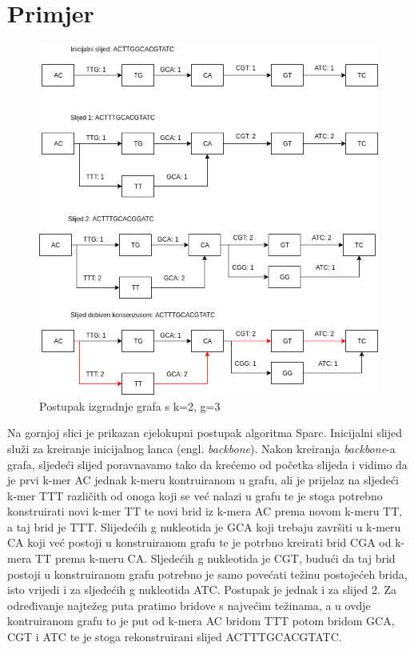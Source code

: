 \documentclass[times, utf8, seminar, numeric]{fer}
\begin{document}
\section{Primjer}
\begin{figure}[htb]
	\centering
	\includegraphics[scale=0.6]{images/backbone.png}
	\caption{Postupak izgradnje grafa s k=2, g=3}
	\label{example}
\end{figure}

Na gornjoj slici je prikazan cjelokupni postupak algoritma Sparc. Inicijalni slijed služi za kreiranje inicijalnog lanca (engl. \emph{backbone}). Nakon kreiranja \emph{backbone}-a grafa, sljedeći slijed poravnavamo tako da krećemo od početka slijeda i vidimo da je prvi k-mer AC jednak k-meru kontruiranom u grafu, ali je prijelaz na sljedeći k-mer TTT različith od onoga koji se već nalazi u grafu te je stoga potrebno konstruirati novi k-mer TT te novi brid iz k-mera AC prema novom k-meru TT, a taj brid je TTT. Slijedećih g nukleotida je GCA koji trebaju završiti u k-meru CA koji već postoji u konstruiranom grafu te je potrbno kreirati brid CGA od k-mera TT prema k-meru CA. Sljedećih g nukleotida je CGT, budući da taj brid postoji u konstruiranom grafu potrebno je samo povećati težinu postojećeh brida, isto vrijedi i za sljedećih g nukleotida ATC. Postupak je jednak i za slijed 2. Za određivanje najtežeg puta pratimo bridove s najvećim težinama, a u ovdje kontruiranom grafu to je put od k-mera AC bridom TTT potom bridom GCA, CGT i ATC te je stoga rekonstruirani slijed ACTTTGCACGTATC.
\end{document}
